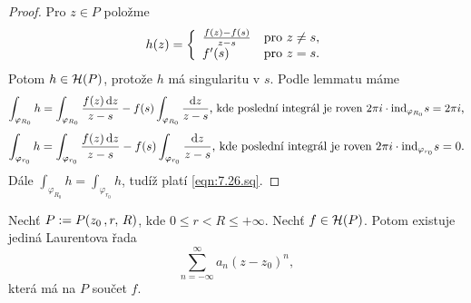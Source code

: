 \begin{proof}
Pro $z \in P$ položme 
\begin{equation*}
    h(z)=\left\{ \begin{array}{ll} \frac{f(z)-f(s)}{z-s} & \mbox{pro } z \neq s, \\ f'(s) & \mbox{pro } z=s. \end{array} \right.
\end{equation*}
Potom $h \in \operatorname{\mathcal{H}} (P)$, protože $h$ má  singularitu v $s$. Podle lemmatu máme
$$
\int_{\varphi_{R_0}}h=\int_{\varphi_{R_0}}\frac{f(z) \mathop{}\!\mathrm{d} z}{z-s}-f(s) \int_{\varphi_{R_0}}\frac{\mathop{}\!\mathrm{d} z}{z-s}\text{, kde poslední integrál je roven }2\pi i \cdot \text{ind}_{\varphi_{R_0}}s=2 \pi i\text{,}
$$
$$
\int_{\varphi_{r_0}}h=\int_{\varphi_{r_0}}\frac{f(z) \mathop{}\!\mathrm{d} z}{z-s}-f(s) \int_{\varphi_{r_0}}\frac{\mathop{}\!\mathrm{d} z}{z-s}\text{, kde poslední integrál je roven }2\pi i \cdot \text{ind}_{\varphi_{r_0}}s=0{.}
$$
Dále $\int_{\varphi_{R_0}}h=\int_{\varphi_{r_0}}h$, tudíž platí \cref{eqn:7.26.sq}.
\end{proof}

\begin{theorem}
Nechť $P:= \\ P(z_0\,,r,\,R)$, kde $0\leq r < R \leq + \infty$. Nechť $f \in \operatorname{\mathcal{H}} (P)$. Potom existuje jediná Laurentova řada 
\begin{equation}
    \sum\limits_{n=-\infty}^{\infty} a_n(z-z_0)^n,  
    \tag{L}
    \label{eqn:7.27.lau}
\end{equation}
která má na $P$ součet $f$.
\end{theorem}


